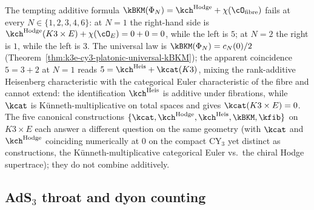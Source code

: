 \begin{remark}[Additivity \texorpdfstring{$\kBKM(\Phi_N) = \kch^{\mathrm{Hodge}} + \chi(\cO_{\mathrm{fibre}})$}{kBKM(Phi-N) = kch-Hodge + chi(O-fibre)} fails at every \texorpdfstring{$N$}{N}]
\label{rem:k3e-cy3-platonic-additivity-fails}
The tempting additive formula $\kBKM(\Phi_N) = \kch^{\mathrm{Hodge}} + \chi(\cO_{\mathrm{fibre}})$ fails at every $N \in \{1, 2, 3, 4, 6\}$: at $N = 1$ the right-hand side is $\kch^{\mathrm{Hodge}}(K3 \times E) + \chi(\cO_E) = 0 + 0 = 0$, while the left is $5$; at $N = 2$ the right is $1$, while the left is $3$. The universal law is $\kBKM(\Phi_N) = c_N(0)/2$ (Theorem~\ref{thm:k3e-cy3-platonic-universal-kBKM}); the apparent coincidence $5 = 3 + 2$ at $N = 1$ reads $5 = \kch^{\mathrm{Heis}} + \kcat(K3)$, mixing the rank-additive Heisenberg characteristic with the categorical Euler characteristic of the fibre and cannot extend: the identification $\kch^{\mathrm{Heis}}$ is additive under fibrations, while $\kcat$ is K\"unneth-multiplicative on total spaces and gives $\kcat(K3 \times E) = 0$. The five canonical constructions $\{\kcat, \kch^{\mathrm{Hodge}}, \kch^{\mathrm{Heis}}, \kBKM, \kfib\}$ on $K3 \times E$ each answer a different question on the same geometry (with $\kcat$ and $\kch^{\mathrm{Hodge}}$ coinciding numerically at $0$ on the compact CY$_3$ yet distinct as constructions, the K\"unneth-multiplicative categorical Euler vs.\ the chiral Hodge supertrace); they do not combine additively.
\end{remark}

\subsection{AdS\texorpdfstring{$_3$}{-3} throat and dyon counting}
\label{subsec:k3e-cy3-platonic-ads3}

